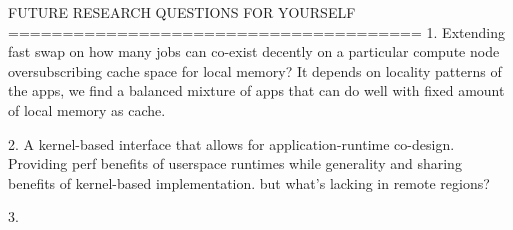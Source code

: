 FUTURE RESEARCH QUESTIONS FOR YOURSELF
======================================
1. Extending fast swap on how many jobs can 
co-exist decently on a particular compute node 
oversubscribing cache space for local memory?
It depends on locality patterns of the apps,
we find a balanced mixture of apps that can 
do well with fixed amount of local memory
as cache.

2. A kernel-based interface that allows for 
application-runtime co-design. Providing perf 
benefits of userspace runtimes while generality 
and sharing benefits of kernel-based 
implementation. but what's lacking in 
remote regions?

3. 